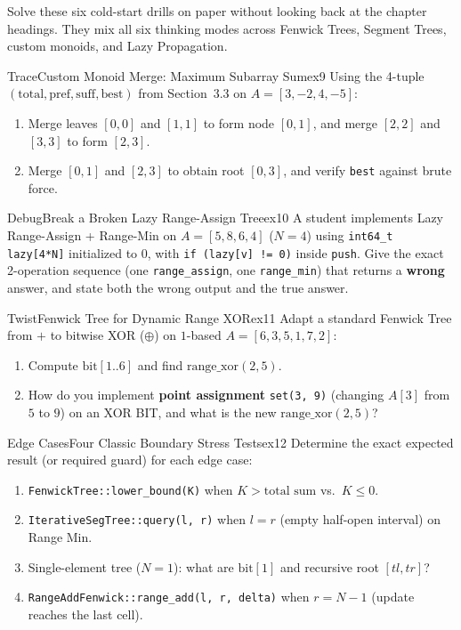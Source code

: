\documentclass[11pt,a4paper]{article}
\theoremstyle{definition}
\begin{document}
Solve these six cold-start drills on paper without looking back at the chapter headings. They mix all six thinking modes across Fenwick Trees, Segment Trees, custom monoids, and Lazy Propagation.

\begin{tryitbox}{Trace}{Custom Monoid Merge: Maximum Subarray Sum}{ex9}
Using the 4-tuple $(\text{total}, \text{pref}, \text{suff}, \text{best})$ from Section~3.3 on $A = [3, -2, 4, -5]$:
\begin{enumerate}[itemsep=2pt, topsep=2pt]
    \item Merge leaves $[0, 0]$ and $[1, 1]$ to form node $[0, 1]$, and merge $[2, 2]$ and $[3, 3]$ to form $[2, 3]$.
    \item Merge $[0, 1]$ and $[2, 3]$ to obtain root $[0, 3]$, and verify \texttt{best} against brute force.
\end{enumerate}
\end{tryitbox}

\begin{tryitbox}{Debug}{Break a Broken Lazy Range-Assign Tree}{ex10}
A student implements Lazy Range-Assign + Range-Min on $A = [5, 8, 6, 4]$ ($N = 4$) using \texttt{int64\_t lazy[4*N]} initialized to $0$, with \texttt{if (lazy[v] != 0)} inside \texttt{push}. Give the exact 2-operation sequence (one \texttt{range\_assign}, one \texttt{range\_min}) that returns a \textbf{wrong} answer, and state both the wrong output and the true answer.
\end{tryitbox}

\begin{tryitbox}{Twist}{Fenwick Tree for Dynamic Range XOR}{ex11}
Adapt a standard Fenwick Tree from $+$ to bitwise XOR ($\oplus$) on $1$-based $A = [6, 3, 5, 1, 7, 2]$:
\begin{enumerate}[itemsep=2pt, topsep=2pt]
    \item Compute $\text{bit}[1..6]$ and find $\text{range\_xor}(2, 5)$.
    \item How do you implement \textbf{point assignment} \texttt{set(3, 9)} (changing $A[3]$ from $5$ to $9$) on an XOR BIT, and what is the new $\text{range\_xor}(2, 5)$?
\end{enumerate}
\end{tryitbox}

\begin{tryitbox}{Edge Cases}{Four Classic Boundary Stress Tests}{ex12}
Determine the exact expected result (or required guard) for each edge case:
\begin{enumerate}[itemsep=2pt, topsep=2pt]
    \item \texttt{FenwickTree::lower\_bound(K)} when $K > \text{total sum}$ vs.\ $K \le 0$.
    \item \texttt{IterativeSegTree::query(l, r)} when $l = r$ (empty half-open interval) on Range Min.
    \item Single-element tree ($N = 1$): what are $\text{bit}[1]$ and recursive root $[tl, tr]$?
    \item \texttt{RangeAddFenwick::range\_add(l, r, delta)} when $r = N - 1$ (update reaches the last cell).
\end{enumerate}
\end{tryitbox}
\end{document}
